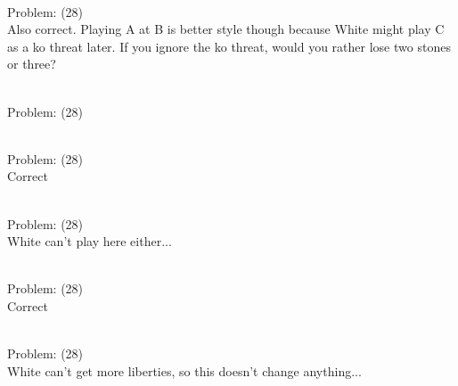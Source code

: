 \documentclass[11pt]{article}
\begin{document}
\begin{minipage}[t]{0.5\textwidth}
  {\centering
  
\\
Problem: (28)\\
Also correct. Playing A at B is better style though because White might play C as a ko threat later. If you ignore the ko threat, would you rather lose two stones or three?\\
  }
\end{minipage}
\begin{minipage}[t]{0.5\textwidth}
  {\centering
  
\\
Problem: (28)\\
  }
\end{minipage}
\begin{minipage}[t]{0.5\textwidth}
  {\centering
  
\\
Problem: (28)\\
Correct\\
  }
\end{minipage}
\begin{minipage}[t]{0.5\textwidth}
  {\centering
  
\\
Problem: (28)\\
White can't play here either...\\
  }
\end{minipage}
\begin{minipage}[t]{0.5\textwidth}
  {\centering
  
\\
Problem: (28)\\
Correct\\
  }
\end{minipage}
\begin{minipage}[t]{0.5\textwidth}
  {\centering
  
\\
Problem: (28)\\
White can't get more liberties, so this doesn't change anything...\\
  }
\end{minipage}
\end{document}
